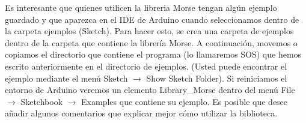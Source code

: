 Es interesante que quienes utilicen la libreria Morse tengan algún ejemplo guardado y que aparezca en el IDE de Arduino cuando seleccionamos dentro de la carpeta ejemplos (Sketch). Para hacer esto, se crea una carpeta de ejemplos dentro de la carpeta que contiene la librería Morse. A continuación, movemos o copiamos el directorio que contiene el programa (lo llamaremos SOS) que hemos escrito anteriormente en el directorio de ejemplos. (Usted puede encontrar el ejemplo mediante el menú Sketch $\to$ Show Sketch Folder). Si reiniciamos el entorno de Arduino veremos un elemento Library\_Morse dentro del menú File $\to$ Sketchbook $\to$ Examples que contiene su ejemplo. Es posible que desee añadir algunos comentarios que explicar mejor cómo utilizar la biblioteca.